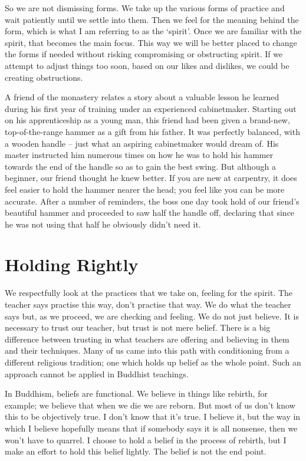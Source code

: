 So we are not dismissing forms. We take up the various forms of practice and wait patiently until we settle into them. Then we feel for the meaning behind the form, which is what I am referring to as the `spirit'. Once we are familiar with the spirit, that becomes the main focus. This way we will be better placed to change the forms if needed without risking compromising or obstructing spirit. If we attempt to adjust things too soon, based on our likes and dislikes, we could be creating obstructions.

A friend of the monastery relates a story about a valuable lesson he
learned during his first year of training under an experienced cabinetmaker. Starting out on his apprenticeship as a young man, this
friend had been given a brand-new, top-of-the-range hammer as a gift
from his father. It was perfectly balanced, with a wooden handle -- just
what an aspiring cabinetmaker would dream of. His master instructed him
numerous times on how he was to hold his hammer towards the end of the
handle so as to gain the best swing. But although a beginner, our friend
thought he knew better. If you are new at carpentry, it does feel easier
to hold the hammer nearer the head; you feel like you can be more
accurate. After a number of reminders, the boss one day took hold of our
friend's beautiful hammer and proceeded to saw half the handle off,
declaring that since he was not using that half he obviously didn't need
it.

\section{Holding Rightly}

We respectfully look at the practices that we take on, feeling for the
spirit. The teacher says practise this way, don't practise that way. We
do what the teacher says but, as we proceed, we are checking and
feeling. We do not just believe. It is necessary to trust our teacher,
but trust is not mere belief. There is a big difference between trusting
in what teachers are offering and believing in them and their
techniques. Many of us came into this path with conditioning from a
different religious tradition; one which holds up belief as the whole
point. Such an approach cannot be applied in Buddhist teachings.

In Buddhism, beliefs are functional. We believe in things like rebirth,
for example; we believe that when we die we are reborn. But most of us
don't know this to be objectively true. I don't know that it's true. I
believe it, but the way in which I believe hopefully means that if somebody
says it is all nonsense, then we won't have to quarrel. I choose to hold a belief in the process of rebirth, but I make an effort to hold this belief lightly. The belief is not the end point.

